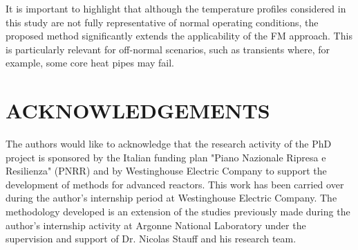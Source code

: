 \documentclass[letterpaper]{physor2026}
\begin{document}
It is important to highlight that although the temperature profiles considered in this study are not fully representative of normal operating conditions, the proposed method significantly extends the applicability of the FM approach. This is particularly relevant for off-normal scenarios, such as transients where, for example, some core heat pipes may fail. 

\section*{ACKNOWLEDGEMENTS}
The authors would like to acknowledge that the research activity of the PhD project is sponsored by the Italian funding plan "Piano Nazionale Ripresa e Resilienza" (PNRR) and by Westinghouse Electric Company to support the development of methods for advanced reactors. 
This work has been carried over during the author's internship period at Westinghouse Electric Company.
The methodology developed is an extension of the studies previously made during the author's internship activity at Argonne National Laboratory under the supervision and support of Dr. Nicolas Stauff and his research team.








\end{document}
